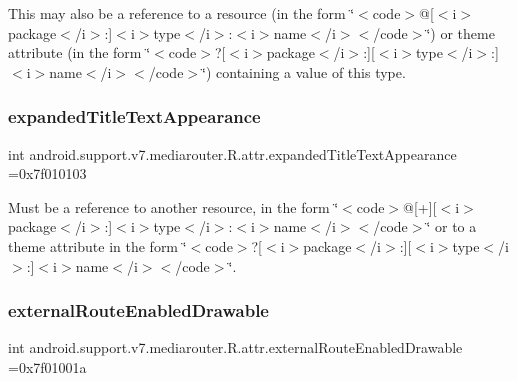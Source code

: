 This may also be a reference to a resource (in the form \char`\"{}$<$code$>$@\mbox{[}$<$i$>$package$<$/i$>$\+:\mbox{]}$<$i$>$type$<$/i$>$\+:$<$i$>$name$<$/i$>$$<$/code$>$\char`\"{}) or theme attribute (in the form \char`\"{}$<$code$>$?\mbox{[}$<$i$>$package$<$/i$>$\+:\mbox{]}\mbox{[}$<$i$>$type$<$/i$>$\+:\mbox{]}$<$i$>$name$<$/i$>$$<$/code$>$\char`\"{}) containing a value of this type. \mbox{\label{classandroid_1_1support_1_1v7_1_1mediarouter_1_1R_1_1attr_a385a00e64804618af33beb484b83c09c}} 
\subsubsection{\texorpdfstring{expanded\+Title\+Text\+Appearance}{expandedTitleTextAppearance}}
{\footnotesize\ttfamily int android.\+support.\+v7.\+mediarouter.\+R.\+attr.\+expanded\+Title\+Text\+Appearance =0x7f010103\hspace{0.3cm}{\ttfamily [static]}}

Must be a reference to another resource, in the form \char`\"{}$<$code$>$@\mbox{[}+\mbox{]}\mbox{[}$<$i$>$package$<$/i$>$\+:\mbox{]}$<$i$>$type$<$/i$>$\+:$<$i$>$name$<$/i$>$$<$/code$>$\char`\"{} or to a theme attribute in the form \char`\"{}$<$code$>$?\mbox{[}$<$i$>$package$<$/i$>$\+:\mbox{]}\mbox{[}$<$i$>$type$<$/i$>$\+:\mbox{]}$<$i$>$name$<$/i$>$$<$/code$>$\char`\"{}. \mbox{\label{classandroid_1_1support_1_1v7_1_1mediarouter_1_1R_1_1attr_ad05965c94dd069d89708ec50e1b52c53}} 
\subsubsection{\texorpdfstring{external\+Route\+Enabled\+Drawable}{externalRouteEnabledDrawable}}
{\footnotesize\ttfamily int android.\+support.\+v7.\+mediarouter.\+R.\+attr.\+external\+Route\+Enabled\+Drawable =0x7f01001a\hspace{0.3cm}{\ttfamily [static]}}

